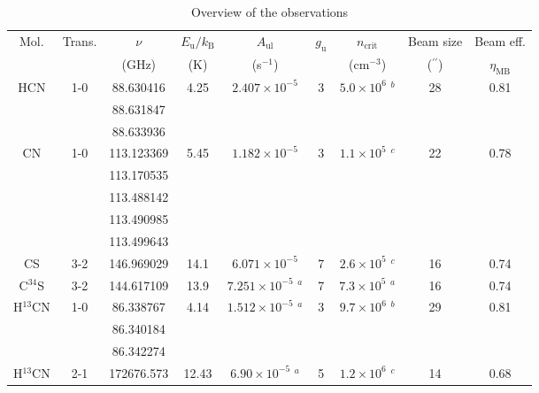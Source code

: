 \documentclass{aa}
\begin{document}
\begin{table*}
\caption{Overview of the observations}             %
\label{table:1}      %
\centering                          %
\begin{tabular}{c c c c c c c c c}        %
\hline\hline                 %
Mol. & Trans. & $\nu$ & $E_\mathrm{u}/k_\mathrm{B}$ &  $A_\mathrm{ul}$ & $g_\mathrm{u}$ & $n_\mathrm{crit}$ &Beam size & Beam eff.\\
 & & (GHz) & (K) & (s$^{-1}$) & & (cm$^{-3}$) & ($^{\prime\prime}$) & $\eta_\mathrm{MB}$\\
\hline                        %
\multirow{3}{*}{HCN} & \multirow{3}{*}{1-0} & 88.630416 & \multirow{3}{*}{4.25} & \multirow{3}{*}{$2.407 \times 10^{-5}$}  & \multirow{3}{*}{3} & \multirow{3}{*}{$5.0 \times 10^{6}$ $^b$} & \multirow{3}{*}{28} & \multirow{3}{*}{0.81}\\
&  & 88.631847 &  &  &  & &  & \\
&  & 88.633936 &  &  &  & &  & \\
\multirow{5}{*}{CN} & \multirow{5}{*}{1-0} & 113.123369 & \multirow{5}{*}{5.45} & \multirow{5}{*}{$1.182 \times 10^{-5}$} & \multirow{5}{*}{3} & \multirow{5}{*}{$1.1 \times 10^{5}$ $^c$} & \multirow{5}{*}{22} & \multirow{5}{*}{0.78}\\
&  & 113.170535 &  &  &  & &  & \\
&  & 113.488142 &  &  &  & &  & \\
&  & 113.490985 &  &  &  & &  & \\
&  & 113.499643 &  &  &  & &  & \\
CS & 3-2 & 146.969029 & 14.1 & $6.071 \times 10^{-5}$ & 7 &$2.6 \times 10^{5}$ $^c$ & 16 & 0.74\\
C$^{34}$S & 3-2 & 144.617109 & 13.9 & $7.251 \times 10^{-5}$ $^a$ & 7 & $7.3 \times 10^{5}$ $^a$ & 16 & 0.74\\
\multirow{3}{*}{H$^{13}$CN} & \multirow{3}{*}{1-0} & 86.338767 & \multirow{3}{*}{4.14} & \multirow{3}{*}{$1.512 \times 10^{-5}$ $^a$} & \multirow{3}{*}{3} & \multirow{3}{*}{$9.7 \times 10^{6}$ $^b$} & \multirow{3}{*}{29} & \multirow{3}{*}{0.81}\\
&  & 86.340184 &  &  &  & &  & \\
&  & 86.342274 &  &  &  & &  & \\
\multirow{3}{*}{H$^{13}$CN} & \multirow{3}{*}{2-1} & 172676.573 & \multirow{3}{*}{12.43} & \multirow{3}{*}{$6.90\times 10^{-5}$ $^a$} & \multirow{3}{*}{5} & \multirow{3}{*}{$1.2 \times 10^{6}$ $^c$} & \multirow{3}{*}{14} & \multirow{3}{*}{0.68}\\

\end{tabular}
\end{table*}
\end{document}
